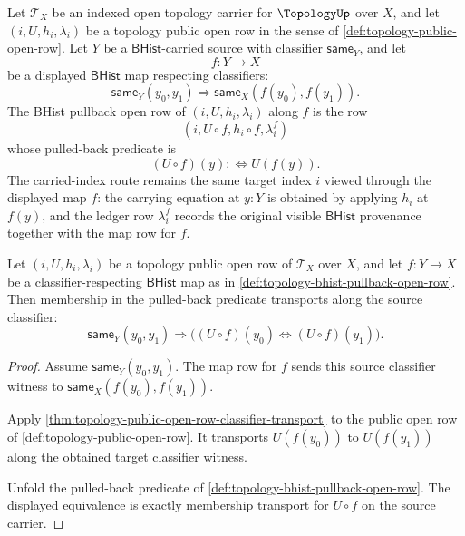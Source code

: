 \begin{definition}
\label{def:topology-bhist-pullback-open-row}
Let $\mathcal{T}_X$ be an indexed open topology carrier for $\TopologyUp$ over $X$, and let $(i,U,h_i,\lambda_i)$ be a topology public open row in the sense of \autoref{def:topology-public-open-row}. Let $Y$ be a $\mathsf{BHist}$-carried source with classifier $\mathsf{same}_Y$, and let
$$
f:Y\to X
$$
be a displayed $\mathsf{BHist}$ map respecting classifiers:
$$
\mathsf{same}_Y(y_0,y_1)
\Longrightarrow
\mathsf{same}_X(f(y_0),f(y_1)).
$$
The BHist pullback open row of $(i,U,h_i,\lambda_i)$ along $f$ is the row
$$
(i,U\circ f,h_i\circ f,\lambda_i^{f})
$$
whose pulled-back predicate is
$$
(U\circ f)(y):\Longleftrightarrow U(f(y)).
$$
The carried-index route remains the same target index $i$ viewed through the displayed map $f$: the carrying equation at $y:Y$ is obtained by applying $h_i$ at $f(y)$, and the ledger row $\lambda_i^{f}$ records the original visible $\mathsf{BHist}$ provenance together with the map row for $f$.
\end{definition}

\begin{theorem}
\label{thm:topology-pullback-open-row-classifier-transport}
Let $(i,U,h_i,\lambda_i)$ be a topology public open row of $\mathcal{T}_X$ over $X$, and let $f:Y\to X$ be a classifier-respecting $\mathsf{BHist}$ map as in \autoref{def:topology-bhist-pullback-open-row}. Then membership in the pulled-back predicate transports along the source classifier:
$$
\mathsf{same}_Y(y_0,y_1)
\Longrightarrow
\bigl((U\circ f)(y_0)\Longleftrightarrow(U\circ f)(y_1)\bigr).
$$
\end{theorem}
\begin{proof}
Assume $\mathsf{same}_Y(y_0,y_1)$. The map row for $f$ sends this source classifier witness to $\mathsf{same}_X(f(y_0),f(y_1))$.

Apply \autoref{thm:topology-public-open-row-classifier-transport} to the public open row of \autoref{def:topology-public-open-row}. It transports $U(f(y_0))$ to $U(f(y_1))$ along the obtained target classifier witness.

Unfold the pulled-back predicate of \autoref{def:topology-bhist-pullback-open-row}. The displayed equivalence is exactly membership transport for $U\circ f$ on the source carrier.
\end{proof}

